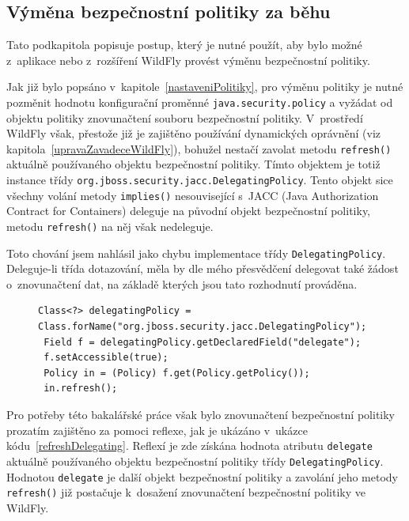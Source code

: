 \subsection{Výměna bezpečnostní politiky za běhu} \label{zmenaZaBehu}

Tato podkapitola popisuje postup, který je nutné použít, aby bylo možné z~aplikace nebo z~rozšíření WildFly provést výměnu bezpečnostní politiky.

Jak již bylo popsáno v~kapitole~\ref{nastaveniPolitiky}, pro výměnu politiky je nutné pozměnit hodnotu konfigurační proměnné
{\tt java.security.policy} a vyžádat od objektu politiky znovunačtení souboru bezpečnostní politiky.
V~prostředí WildFly však, přestože již je zajištěno používání dynamických oprávnění (viz kapitola~\ref{upravaZavadeceWildFly}), bohužel nestačí zavolat metodu {\tt refresh()} aktuálně používaného objektu bezpečnostní politiky. Tímto objektem je totiž instance třídy {\tt org.jboss.security.jacc.DelegatingPolicy}. Tento objekt sice všechny volání metody {\tt implies()} nesouvisející s~JACC (Java Authorization Contract for Containers) deleguje na původní objekt bezpečnostní politiky, metodu {\tt refresh()} na něj však nedeleguje.

Toto chování jsem nahlásil jako chybu implementace třídy {\tt DelegatingPolicy}. Deleguje-li třída dotazování, měla by dle mého přesvědčení delegovat také žádost o~znovunačtení dat, na základě kterých jsou tato rozhodnutí prováděna.~\cite{issueDelegating}

\begin{figure}[b!]
\begin{lstlisting}[caption=Znovunačtení bezpečnostní politiky při nastavené {\tt DelegatingPolicy}, label=refreshDelegating]
 Class<?> delegatingPolicy = Class.forName("org.jboss.security.jacc.DelegatingPolicy");
 Field f = delegatingPolicy.getDeclaredField("delegate");
 f.setAccessible(true);
 Policy in = (Policy) f.get(Policy.getPolicy());
 in.refresh();
\end{lstlisting}
\end{figure}

Pro potřeby této bakalářské práce však bylo znovunačtení bezpečnostní politiky prozatím zajištěno za pomoci reflexe, jak je ukázáno v~ukázce kódu~\ref{refreshDelegating}.
Reflexí je zde získána hodnota atributu {\tt delegate} aktuálně používaného objektu bezpečnostní politiky třídy {\tt DelegatingPolicy}.
Hodnotou {\tt delegate} je další objekt bezpečnostní politiky a zavolání jeho metody {\tt refresh()} již postačuje k~dosažení znovunačtení bezpečnostní politiky ve WildFly.

